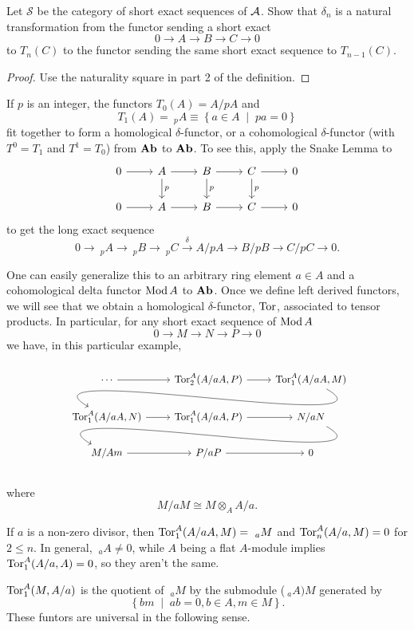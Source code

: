 \documentclass[reqno, 12pt]{amsart}
\begin{document}
\begin{exercise}
  Let $\mathcal{S}$ be the category of short exact sequences of $\mathcal{A}$.
  Show that $\delta_n$ is a natural transformation from the functor sending a short exact
  $$0 \to A \to B \to C \to 0$$
  to $T_n(C)$ to the functor sending the same short exact sequence to $T_{n-1}(C)$.
\end{exercise}
\begin{proof}
  Use the naturality square in part 2 of the definition.
\end{proof}

\begin{example}[$p$-torsion]
  If $p$ is an integer, the functors $T_0(A) = A/pA$ and
  $$T_1(A) =\ _pA \equiv \left\{ a \in A \;\middle\vert\; pa = 0\right\}$$
  fit together to form a homological $\delta$-functor, or a cohomological $\delta$-functor (with $T^0 = T_1$ and $T^1 = T_0$) from $\operatorname{\bf Ab}$ to $\operatorname{\bf Ab}$.
  To see this, apply the Snake Lemma to
  $$\begin{tikzcd}
    0 \arrow{r} & A\arrow{r}\arrow{d}{p} & B \arrow{d}{p}\arrow{r} & C\arrow{d}{p}\arrow{r} & 0\\
    0 \arrow{r} & A \arrow{r} & B \arrow{r} & C \arrow{r} & 0
  \end{tikzcd}$$
  to get the long exact sequence
  $$0 \to\ _pA \to\ _pB \to\ _pC \overset{\delta}\to A/pA \to B/pB \to C/pC \to 0.$$

  One can easily generalize this to an arbitrary ring element $a \in A$ and a cohomological delta functor $\operatorname{Mod}A$ to $\operatorname{\bf Ab}$.
  Once we define left derived functors, we will see that we obtain a homological $\delta$-functor, $\operatorname{Tor}$, associated to tensor products.
  In particular, for any short exact sequence of $\operatorname{Mod}A$
  $$0 \to M \to N \to P \to 0$$
  we have, in this particular example,
  $$\begin{tikzcd}
    \cdots \arrow{r} & \op{Tor}^A_2(A/aA, P) \arrow{r} & \op{Tor}^A_1(A/aA, M) \arrow[out=-30,in=150]{lld}\\
    \op{Tor}^A_1(A/aA, N) \arrow{r} & \op{Tor}^A_1(A/aA,P) \arrow{r} & N/aN\arrow[out=-30,in=150]{lld}\\
    \arrow{r} M/Am & P/aP \arrow{r} & 0
  \end{tikzcd}$$
  
  where
  $$M/aM \cong M \otimes_A A/a.$$

  If $a$ is a non-zero divisor, then $\operatorname{Tor}^A_1(A/aA, M) =\ _aM$ and $\operatorname{Tor}^A_n(A/a, M) = 0$ for $2 \leq n$.
  In general, $\ _aA \neq 0$, while $A$ being a flat $A$-module implies $\operatorname{Tor}_1^A(A/a, A) = 0$, so they aren't the same.

  $\operatorname{Tor}_1^A(M, A/a)$ is the quotient of $\ _aM$ by the submodule ($\ _aA)M$ generated by
  $$\left\{bm \;\middle\vert\; ab = 0, b \in A, m \in M\right\}.$$
  These funtors are universal in the following sense.
\end{example}
\end{document}
